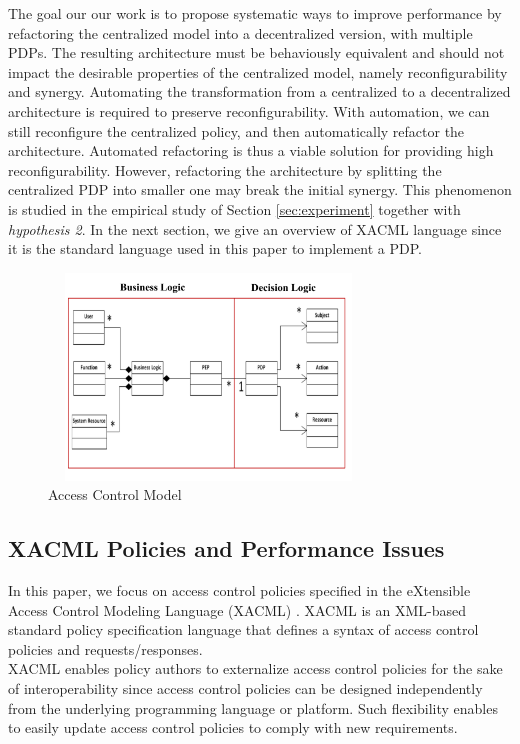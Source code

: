 The goal our our work is to propose systematic ways to improve performance by refactoring the centralized model into a decentralized version, with multiple PDPs. The resulting
 architecture must be behaviously equivalent and should not impact the desirable properties of the centralized model, namely reconfigurability and synergy.
Automating the transformation from a centralized to a decentralized architecture is required to preserve reconfigurability. With automation, we can still reconfigure the centralized policy, 
and then automatically refactor the architecture. Automated refactoring is thus a viable solution for providing high reconfigurability.  
However, refactoring the architecture by splitting the centralized PDP into smaller one may break the initial synergy. This phenomenon is studied in the empirical study of Section 
\ref{sec:experiment} together with \textit{hypothesis 2}. In the next section, we give an overview of XACML language since it is the standard language used in this paper to implement a PDP.


\begin{figure}[!h]
\begin{center}
\includegraphics[height=5.5cm,width=8.5cm]{model}
\caption{Access Control Model}
\label{model}
\end{center}
\end{figure}

\subsection{XACML Policies and Performance Issues}

In this paper, we focus on access control policies specified in the eXtensible Access Control Modeling Language (XACML) \cite{sunxacml}.
XACML is an XML-based standard policy specification language that defines a syntax of access control policies and
requests/responses. \\XACML enables policy authors to externalize access control policies for the sake of interoperability since access control policies can be designed 
independently from the underlying programming language or platform. Such flexibility enables to easily update access control policies to comply with new requirements.

